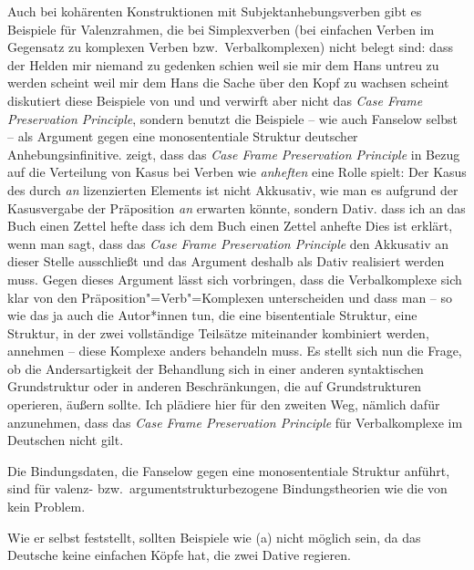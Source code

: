 {        Auch bei kohärenten Konstruktionen mit Subjektanhebungsverben gibt es Beispiele für Valenzrahmen,
        die bei Simplexverben (\dash bei einfachen Verben im Gegensatz zu komplexen Verben
        bzw.\ Verbalkomplexen) nicht belegt sind:
        \eal
        \ex dass der Helden mir niemand zu gedenken schien
        \ex weil sie mir dem Hans untreu zu werden scheint
        \ex weil mir dem Hans die Sache über den Kopf zu wachsen scheint
        \zl
        \citet[]{Grewendorf94a} diskutiert diese Beispiele von \citet[]{Olsen81a}
        und \citet{Fanselow89b} und verwirft aber nicht das \emph{Case Frame Preservation Principle},
        sondern benutzt die Beispiele -- wie auch Fanselow selbst -- als Argument gegen eine monosententiale Struktur
        deutscher Anhebungsinfinitive. \citet[]{Fanselow89b} zeigt, dass
        das \emph{Case Frame Preservation Principle} in Bezug auf die Verteilung von Kasus
        bei Verben wie \emph{anheften} eine Rolle spielt: Der Kasus
        des durch \emph{an} lizenzierten Elements ist nicht Akkusativ, wie man es aufgrund
        der Kasusvergabe der Präposition \emph{an} erwarten könnte, sondern Dativ.
        \eal
        \ex dass ich an das Buch einen Zettel hefte
        \ex dass ich dem Buch einen Zettel anhefte
        \zl
        Dies ist erklärt, wenn man sagt, dass das \emph{Case Frame Preservation Principle}
        den Akkusativ an dieser Stelle ausschließt und das Argument deshalb als Dativ
        realisiert werden muss. Gegen dieses Argument lässt sich vorbringen, dass die Verbalkomplexe
        sich klar von den Präposition"=Verb"=Komplexen unterscheiden und dass man -- so wie
        das ja auch die Autor*innen tun, die eine bisententiale Struktur, \dash eine Struktur, in der zwei
        vollständige Teilsätze miteinander kombiniert werden, annehmen -- diese
        Komplexe anders behandeln muss. Es stellt sich nun die Frage, ob die Andersartigkeit 
        der Behandlung sich in einer anderen syntaktischen Grundstruktur oder in anderen
        Beschränkungen, die auf Grundstrukturen operieren, äußern sollte. Ich plädiere
        hier für den zweiten Weg, nämlich dafür anzunehmen, dass das \emph{Case Frame Preservation Principle}
        für Verbalkomplexe im Deutschen nicht gilt.

        Die Bindungsdaten, die Fanselow gegen eine monosententiale Struktur anführt,
        sind für valenz- bzw.\ argumentstrukturbezogene Bindungstheorien wie die von \textcites{PS92a}[Kapitel~6]{ps2}
        kein Problem.
}
Wie er selbst feststellt, sollten Beispiele wie (a) nicht möglich sein,
da das Deutsche keine einfachen Köpfe hat, die zwei Dative regieren.
\largerpage

